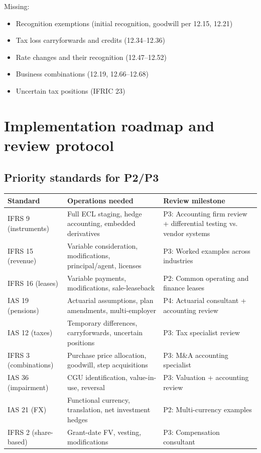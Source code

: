  Missing:
\begin{itemize}
\item Recognition exemptions (initial recognition, goodwill per 12.15, 12.21)
\item Tax loss carryforwards and credits (12.34--12.36)
\item Rate changes and their recognition (12.47--12.52)
\item Business combinations (12.19, 12.66--12.68)
\item Uncertain tax positions (IFRIC 23)
\end{itemize}

\section{Implementation roadmap and review protocol}

\subsection{Priority standards for P2/P3}

\begin{longtable}{L{35mm}L{55mm}L{46mm}}
\toprule Standard & Operations needed & Review milestone\\\midrule\endhead
IFRS 9 (instruments) & Full ECL staging, hedge accounting, embedded derivatives &
P3: Accounting firm review + differential testing vs. vendor systems\\
IFRS 15 (revenue) & Variable consideration, modifications, principal/agent,
licenses & P3: Worked examples across industries\\
IFRS 16 (leases) & Variable payments, modifications, sale-leaseback & P2: Common
operating and finance leases\\
IAS 19 (pensions) & Actuarial assumptions, plan amendments, multi-employer &
P4: Actuarial consultant + accounting review\\
IAS 12 (taxes) & Temporary differences, carryforwards, uncertain positions &
P3: Tax specialist review\\
IFRS 3 (combinations) & Purchase price allocation, goodwill, step acquisitions &
P3: M\&A accounting specialist\\
IAS 36 (impairment) & CGU identification, value-in-use, reversal & P3: Valuation
+ accounting review\\
IAS 21 (FX) & Functional currency, translation, net investment hedges & P2:
Multi-currency examples\\
IFRS 2 (share-based) & Grant-date FV, vesting, modifications & P3: Compensation
consultant\\\bottomrule
\end{longtable}

